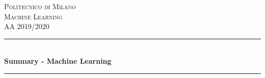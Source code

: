 \documentclass[12pt]{article}
\begin{document}
\begin{titlepage}

\newcommand{\HRule}{\rule{\linewidth}{0.5mm}} %



\center %
 

\textsc{\LARGE Politecnico di Milano}\\[1.5cm] %
\textsc{\Large Machine Learning}\\[0.5cm] %
\textsc{\large AA 2019/2020}\\[0.5cm] %


\HRule \\[0.4cm]
{ \huge \bfseries Summary - Machine Learning}\\[0.4cm] %
\HRule \\[1.5cm]
 




\end{titlepage}
\end{document}
